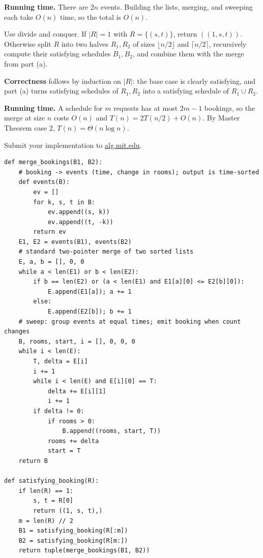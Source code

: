 \documentclass[12pt,twoside]{article}
\begin{document}
\begin{problems}
\begin{problemparts}
\textbf{Running time.} There are $2n$ events. Building the lists, merging, and sweeping each take
$O(n)$ time, so the total is $O(n)$.

\problempart %
Use divide and conquer. If $|R|=1$ with $R=\{(s,t)\}$, return $((1,s,t))$. Otherwise split $R$ into
two halves $R_1,R_2$ of sizes $\lfloor n/2\rfloor$ and $\lceil n/2\rceil$, recursively compute
their satisfying schedules $B_1,B_2$, and combine them with the merge from part (a).

\textbf{Correctness} follows by induction on $|R|$: the base case is clearly satisfying, and
part (a) turns satisfying schedules of $R_1,R_2$ into a satisfying schedule of $R_1\cup R_2$.

\textbf{Running time.} A schedule for $m$ requests has at most $2m-1$ bookings, so the merge at size
$n$ costs $O(n)$ and $T(n)=2T(n/2)+O(n)$. By Master Theorem case 2, $T(n)=\Theta(n\log n)$.

\problempart Submit your implementation to {\small\url{alg.mit.edu}}.

\begin{verbatim}
def merge_bookings(B1, B2):
    # booking -> events (time, change in rooms); output is time-sorted
    def events(B):
        ev = []
        for k, s, t in B:
            ev.append((s, k))
            ev.append((t, -k))
        return ev
    E1, E2 = events(B1), events(B2)
    # standard two-pointer merge of two sorted lists
    E, a, b = [], 0, 0
    while a < len(E1) or b < len(E2):
        if b == len(E2) or (a < len(E1) and E1[a][0] <= E2[b][0]):
            E.append(E1[a]); a += 1
        else:
            E.append(E2[b]); b += 1
    # sweep: group events at equal times; emit booking when count changes
    B, rooms, start, i = [], 0, 0, 0
    while i < len(E):
        T, delta = E[i]
        i += 1
        while i < len(E) and E[i][0] == T:
            delta += E[i][1]
            i += 1
        if delta != 0:
            if rooms > 0:
                B.append((rooms, start, T))
            rooms += delta
            start = T
    return B

def satisfying_booking(R):
    if len(R) == 1:
        s, t = R[0]
        return ((1, s, t),)
    m = len(R) // 2
    B1 = satisfying_booking(R[:m])
    B2 = satisfying_booking(R[m:])
    return tuple(merge_bookings(B1, B2))
\end{verbatim}
\end{problemparts}

\end{problems}
\end{document}
